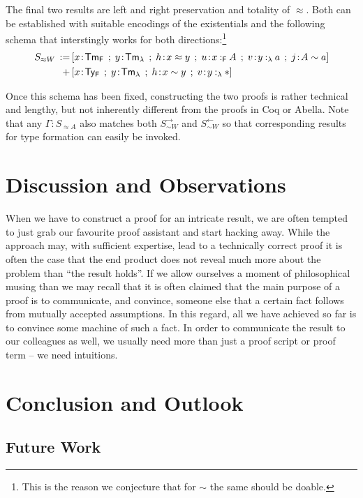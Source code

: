 \documentclass[a4paper,UKenglish]{lipics-v2016}
\newcommand{\ms}{\,}
\newcommand{\mrel}[1]{\mathrel{\ms #1 \ms}}
\newcommand{\eqdef}{\mrel{:=}}
\newcommand{\SysF}{\ensuremath{\mathsf{F}}\xspace}
\newcommand{\TyF}{\ensuremath{\mathsf{Ty_{F}}}}
\newcommand{\TmF}{\ensuremath{\mathsf{Tm_{F}}}}
\newcommand{\TmL}{\ensuremath{\mathsf{Tm_{\lambda}}}}
\newcommand{\of}{\ensuremath{\!:\!}}
\newcommand{\typingFh}[2]{\ensuremath{#1 \mathbin{:_{\SysF}} #2}}
\newcommand{\typingLh}[2]{\ensuremath{#1 \mathbin{:_{\lambda}} #2}}
\newcommand{\tyr}{\mathrel{\sim}}
\newcommand{\tmr}{\mathrel{\approx}}
\newcommand{\Prp}{\ensuremath{\textrm{\textasteriskcentered}}}
\begin{document}
The final two results are left and right preservation and totality of $\tmr$.
Both can be established with suitable encodings of the existentials and the following schema that interstingly works for both directions:\footnote{This is the reason we conjecture that for $\tyr$ the same should be doable.}
\begin{align*}
  S_{\tmr W} \eqdef &[x\of\TmF \mrel{;} y\of\TmL \mrel{;} h\of x \tmr y \mrel{;} u\of\typingFh{x}{A} \mrel{;} v\of\typingLh{y}{a} \mrel{;} j \of A \tyr a]\\
  \mrel{+} &[x\of\TyF \mrel{;} y\of\TmL \mrel{;} h\of x \tyr y \mrel{;} v\of\typingLh{y}{\Prp}]
\end{align*}

Once this schema has been fixed, constructing the two proofs is rather technical and lengthy, but not inherently different from the proofs in Coq or Abella.
Note that any $\Gamma \of S_{\tmr A}$ also matches both $S_{\tyr W}^{\rightarrow}$ and $S_{\tyr W}^{\leftarrow}$ so that corresponding results for type formation can easily be invoked.

\section{Discussion and Observations}
\label{sec:disc-observ}

When we have to construct a proof for an intricate result, we are often tempted to just grab our favourite proof assistant and start hacking away.
While the approach may, with sufficient expertise, lead to a technically correct proof it is often the case that the end product does not reveal much more about the problem than ``the result holds''.
If we allow ourselves a moment of philosophical musing than we may recall that it is often claimed that the main purpose of a proof is to communicate, and convince, someone else that a certain fact follows from mutually accepted assumptions.
In this regard, all we have achieved so far is to convince some machine of such a fact.
In order to communicate the result to our colleagues as well, we usually need more than just a proof script or proof term -- we need intuitions.


\section{Conclusion and Outlook}
\label{sec:conclusion}

\subsection{Future Work}
\label{sec:future-work}
\end{document}

